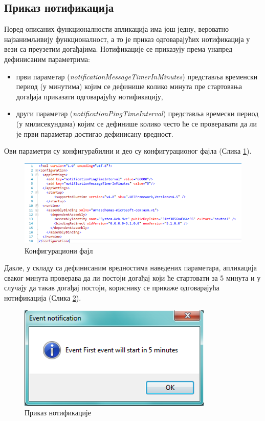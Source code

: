 \subsection{Приказ нотификација}

Поред описаних функционалности апликација има још једну, вероватно најзанимљивију функционалност, а то је приказ одговарајућих нотификација у вези са преузетим догађајима. Нотификације се приказују према унапред дефинисаним параметрима:
\begin{itemize}
	\item{први параметар (\textit{notificationMessageTimerInMinutes}) представља временски период (у минутима) којим се дефинише колико минута пре стартовања догађаја приказати одговарајућу нотификацију},
	\item{други параметар (\textit{notificationPingTimeInterval}) представља времески период (у милисекундама) којим се дефинише колико често ће се проверавати да ли је први параметар достигао дефинисану вредност}.	

\end{itemize}
Ови параметри су конфигурабилни и део су конфигурационог фајла (Слика \ref{fig:app_config}).

\begin{figure}[H]
	\centering
	\includegraphics[scale=0.5]{slike/AppConfig.png}
	\caption{Конфигурациони фајл}
	\label{fig:app_config}
\end{figure}

Дакле, у складу са дефинисаним вредностима наведених параметара, апликација сваког минута проверава да ли постоји догађај који ће стартовати за 5 минута и у случају да такав догађај постоји, кориснику се прикаже одговарајућа нотификација (Слика \ref{fig:event_notification}).

\begin{figure}[H]
	\centering
	\includegraphics[scale=0.5]{slike/EventNotification.png}
	\caption{Приказ нотификације}
	\label{fig:event_notification}
\end{figure}

